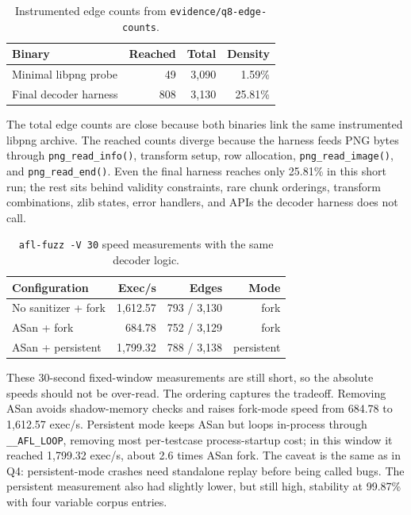 \documentclass[letterpaper,twocolumn,10pt]{article}
\begin{document}
\begin{table}[h]
\centering
\small
\begin{tabular}{lrrr}
\toprule
\textbf{Binary} & \textbf{Reached} & \textbf{Total} & \textbf{Density} \\
\midrule
Minimal libpng probe & 49 & 3{,}090 & 1.59\% \\
Final decoder harness & 808 & 3{,}130 & 25.81\% \\
\bottomrule
\end{tabular}
\caption{Instrumented edge counts from \texttt{evidence/q8-edge-counts}.}
\end{table}

The total edge counts are close because both binaries link the same
instrumented libpng archive. The reached counts diverge because the harness
feeds PNG bytes through \texttt{png\_read\_info()}, transform setup, row allocation,
\texttt{png\_read\_image()}, and \texttt{png\_read\_end()}. Even the final
harness reaches only 25.81\% in this short run; the rest sits behind validity
constraints, rare chunk orderings, transform combinations, zlib states, error
handlers, and APIs the decoder harness does not call.

\begin{table}[h]
\centering
\small
\begin{tabular}{lrrr}
\toprule
\textbf{Configuration} & \textbf{Exec/s} & \textbf{Edges} & \textbf{Mode} \\
\midrule
No sanitizer + fork & 1{,}612.57 & 793 / 3{,}130 & fork \\
ASan + fork & 684.78 & 752 / 3{,}129 & fork \\
ASan + persistent & 1{,}799.32 & 788 / 3{,}138 & persistent \\
\bottomrule
\end{tabular}
\caption{\texttt{afl-fuzz -V 30} speed measurements with the same decoder logic.}
\end{table}

These 30-second fixed-window measurements are still short, so the absolute
speeds should not be over-read. The ordering captures the tradeoff. Removing
ASan avoids shadow-memory checks and raises fork-mode speed from 684.78 to
1{,}612.57 exec/s. Persistent mode keeps ASan but loops in-process through
\texttt{\_\_AFL\_LOOP}, removing most per-testcase process-startup cost; in
this window it reached 1{,}799.32 exec/s, about 2.6 times ASan fork. The caveat
is the same as in Q4: persistent-mode crashes need standalone replay before
being called bugs. The persistent measurement also had slightly lower, but still
high, stability at 99.87\% with four variable corpus entries.
\end{document}
